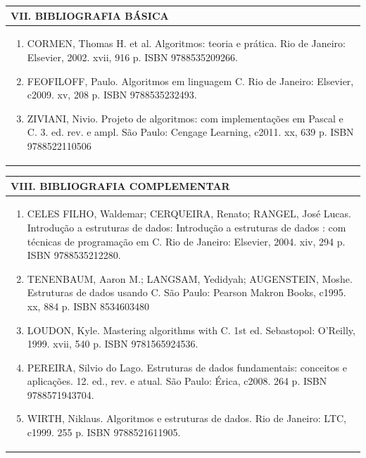 \documentclass[12pt]{article}
\begin{document}
\begin{longtable}{|L{1.025\textwidth}|} \hline
%
{\bf VII. BIBLIOGRAFIA BÁSICA} \\ \hline
\begin{enumerate}
\item CORMEN, Thomas H. et al. Algoritmos: teoria e prática. Rio de Janeiro: Elsevier, 2002. xvii, 916 p. ISBN 9788535209266.
\item FEOFILOFF, Paulo. Algoritmos em linguagem C. Rio de Janeiro: Elsevier, c2009. xv, 208 p. ISBN 9788535232493.
\item ZIVIANI, Nivio. Projeto de algoritmos: com implementações em Pascal e C. 3. ed. rev. e ampl. São Paulo: Cengage Learning, c2011. xx, 639 p. ISBN 9788522110506
\end{enumerate}
 \\ \hline
\end{longtable}



\begin{longtable}{|L{1.025\textwidth}|} \hline
%
{\bf VIII. BIBLIOGRAFIA COMPLEMENTAR} \\ \hline
\begin{enumerate}

\item CELES FILHO, Waldemar; CERQUEIRA, Renato; RANGEL, José Lucas. Introdução a
estruturas de dados: Introdução a estruturas de dados : com técnicas de programação em C. Rio de Janeiro: Elsevier, 2004. xiv, 294 p. ISBN 9788535212280.
\item TENENBAUM, Aaron M.; LANGSAM, Yedidyah; AUGENSTEIN, Moshe. Estruturas
de dados usando C. São Paulo: Pearson Makron Books, c1995. xx, 884 p. ISBN
8534603480
\item LOUDON, Kyle. Mastering algorithms with C. 1st ed. Sebastopol: O’Reilly, 1999. xvii, 540 p. ISBN 9781565924536.
\item PEREIRA, Silvio do Lago. Estruturas de dados fundamentais: conceitos e aplicações. 12. ed., rev. e atual. São Paulo: Érica, c2008. 264 p. ISBN 9788571943704.
\item WIRTH, Niklaus. Algoritmos e estruturas de dados. Rio de Janeiro: LTC, c1999. 255 p. ISBN 9788521611905.


%
\end{enumerate}
 \\ \hline
\end{longtable}



\end{document}
